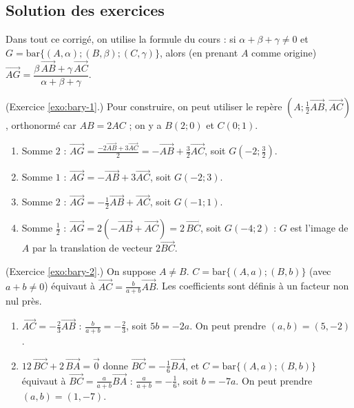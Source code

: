 \begin{corrige}
\section{Solution des exercices}
Dans tout ce corrig\'e, on utilise la formule du cours : si $\alpha + \beta + \gamma \neq 0$ et
$G = \mathrm{bar}\{(A,\alpha);(B,\beta);(C,\gamma)\}$, alors (en prenant $A$ comme origine)
$\overrightarrow{AG} = \dfrac{\beta\,\overrightarrow{AB} + \gamma\,\overrightarrow{AC}}{\alpha+\beta+\gamma}$.
%
\begin{sol} (Exercice \ref{exo:bary-1}.)
Pour construire, on peut utiliser le rep\`ere $\left(A ; \frac{1}{2}\overrightarrow{AB}, \overrightarrow{AC}\right)$, orthonorm\'e car $AB = 2AC$ ;
on y a $B(2;0)$ et $C(0;1)$.
\begin{enumerate}
\item Somme $2$ : $\overrightarrow{AG} = \frac{-2\overrightarrow{AB} + 3\overrightarrow{AC}}{2} = -\overrightarrow{AB} + \frac{3}{2}\overrightarrow{AC}$, soit $G(-2 ; \frac{3}{2})$.
\item Somme $1$ : $\overrightarrow{AG} = -\overrightarrow{AB} + 3\overrightarrow{AC}$, soit $G(-2 ; 3)$.
\item Somme $2$ : $\overrightarrow{AG} = -\frac{1}{2}\overrightarrow{AB} + \overrightarrow{AC}$, soit $G(-1 ; 1)$.
\item Somme $\frac{1}{2}$ : $\overrightarrow{AG} = 2\left(-\overrightarrow{AB} + \overrightarrow{AC}\right) = 2\,\overrightarrow{BC}$, soit $G(-4 ; 2)$ :
      $G$ est l'image de $A$ par la translation de vecteur $2\overrightarrow{BC}$.
\end{enumerate}
\end{sol}
%
\begin{sol} (Exercice \ref{exo:bary-2}.)
On suppose $A \neq B$. $C = \mathrm{bar}\{(A,a);(B,b)\}$ (avec $a+b\neq 0$) \'equivaut \`a $\overrightarrow{AC} = \frac{b}{a+b}\overrightarrow{AB}$.
Les coefficients sont d\'efinis \`a un facteur non nul pr\`es.
\begin{enumerate}
\item $\overrightarrow{AC} = -\frac{2}{3}\overrightarrow{AB}$ : $\frac{b}{a+b} = -\frac{2}{3}$, soit $5b = -2a$. On peut prendre $(a,b) = (5,-2)$.
\item $12\,\overrightarrow{BC} + 2\,\overrightarrow{BA} = \vec{0}$ donne $\overrightarrow{BC} = -\frac{1}{6}\overrightarrow{BA}$, et
      $C = \mathrm{bar}\{(A,a);(B,b)\}$ \'equivaut \`a $\overrightarrow{BC} = \frac{a}{a+b}\overrightarrow{BA}$ :
      $\frac{a}{a+b} = -\frac{1}{6}$, soit $b = -7a$. On peut prendre $(a,b) = (1,-7)$.

\end{enumerate}
\end{sol}
\end{corrige}

